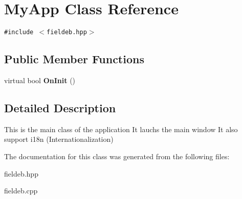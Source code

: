 \section{My\-App Class Reference}
\label{classMyApp}
{\tt \#include $<$fieldeb.hpp$>$}

\subsection*{Public Member Functions}
\begin{CompactItemize}
\item 
virtual bool {\bf On\-Init} ()\label{classMyApp_a0}

\end{CompactItemize}


\subsection{Detailed Description}
This is the main class of the application It lauchs the main window It also support i18n (Internationalization) 



The documentation for this class was generated from the following files:\begin{CompactItemize}
\item 
fieldeb.hpp\item 
fieldeb.cpp\end{CompactItemize}
